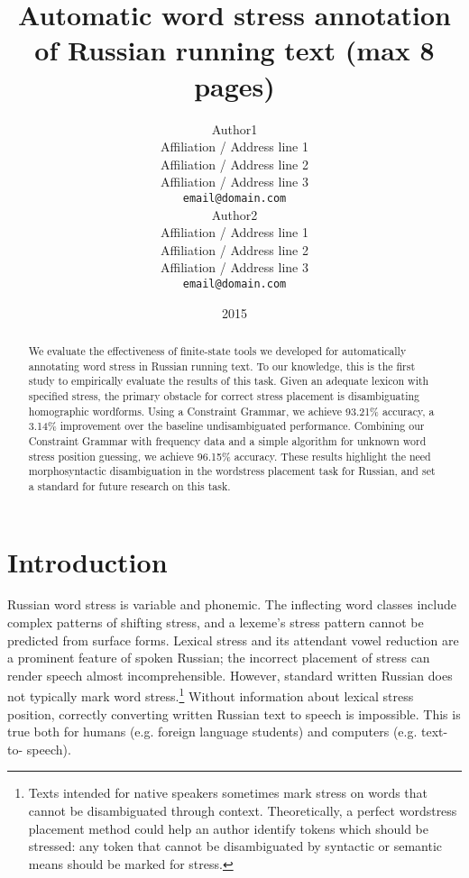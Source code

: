 \documentclass[11pt]{article}
\title{Automatic word stress annotation of Russian running text (max 8 pages)}
\author{Author1 \\
  Affiliation / Address line 1 \\
  Affiliation / Address line 2 \\
  Affiliation / Address line 3 \\
  {\tt email@domain.com} \\\And
  Author2 \\
  Affiliation / Address line 1 \\
  Affiliation / Address line 2 \\
  Affiliation / Address line 3 \\
  {\tt email@domain.com} \\}
\date{2015}
\begin{document}
\maketitle
\begin{abstract}
  We evaluate the effectiveness of finite-state tools we developed for 
  automatically annotating word stress in Russian running text. To our knowledge,
  this is the first study to empirically evaluate the results of this task. 
  Given an adequate 
  lexicon with specified stress, the primary obstacle for correct stress 
  placement is disambiguating homographic wordforms. Using a Constraint Grammar, 
  we achieve 93.21\% accuracy, a 3.14\% improvement over the baseline
  undisambiguated performance. 
  Combining our Constraint Grammar with frequency data and a simple
  algorithm for unknown word stress position guessing, we achieve 96.15\%
  accuracy. These results highlight the need morphosyntactic disambiguation
  in the wordstress placement task for Russian, and set a standard for future
  research on this task.
\end{abstract}

%

\section{Introduction}

Russian word stress is variable and phonemic. The inflecting word classes include complex 
patterns of shifting stress, and a lexeme's stress pattern cannot be predicted 
from surface forms. Lexical stress and its attendant vowel reduction are 
a prominent feature of spoken Russian; the incorrect placement of stress
can render speech almost incomprehensible. However, standard written Russian does not 
typically mark word stress.\footnote{Texts intended for native speakers sometimes 
mark stress on words that cannot be disambiguated through context. Theoretically, 
a perfect wordstress placement method could help an author identify
tokens which should be stressed: any token that cannot
be disambiguated by syntactic or semantic means should be marked for stress.} 
Without information about lexical stress position, 
correctly converting written Russian text to speech is impossible. This is true 
both for humans (e.g. foreign language students) and computers (e.g. text-to-
speech).
\end{document}
